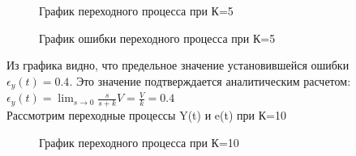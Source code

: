 \documentclass[a4paper, 11pt]{article}
\begin{document}
\begin{figure}[h!]
    \caption{График переходного процесса при К=5}
    \label{two}
\end{figure}

\begin{figure}[h!]
    \caption{График ошибки переходного процесса при К=5}
    \label{tree}
\end{figure}

Из графика видно, что предельное значение установившейся ошибки $\epsilon_y(t)=0.4$. Это значение подтверждается аналитическим расчетом: $\epsilon_y(t)=\lim_{s\to0}\frac{s}{s+k}V=\frac{V}{k}=0.4$\\

Рассмотрим переходные процессы Y(t) и e(t) при К=10

\begin{figure}[h!]
    \caption{График переходного процесса при К=10}
    \label{two}
\end{figure}

\newpage
\end{document}
